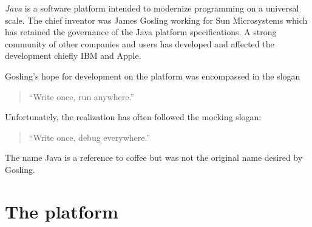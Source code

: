 \documentclass[12pt]{article}
\begin{document}
{\em Java} is a software platform intended to modernize programming on a universal scale.  The chief inventor was James Gosling working for Sun Microsystems which has retained the governance of the Java platform specifications.  A strong community of other companies and users has developed and affected the development chiefly IBM and Apple.  

Gosling's hope for development on the platform was encompassed in the slogan
\begin{quote}
``Write once, run anywhere.''
\end{quote}
Unfortunately, the realization has often followed the mocking slogan:
\begin{quote}
``Write once, debug everywhere.''
\end{quote}
The name Java is a reference to coffee but was not the original name 
desired by Gosling.

\section{The platform}
\end{document}
